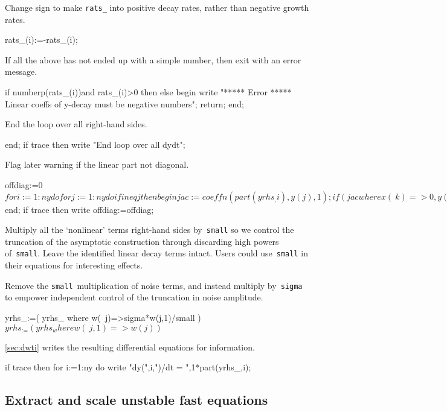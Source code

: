 \documentclass[11pt,a5paper]{article}
\begin{document}
Change sign to make \verb|rats_| into positive decay rates, rather than negative growth rates.
\begin{reduce}
  rats_(i):=-rats_(i); 
\end{reduce}

If all the above has not ended up with a simple number, then exit with an error message. 
\begin{reduce}
  if numberp(rats_(i))and rats_(i)>0 then
  else begin 
    write "***** Error *****
    Linear coeffs of y-decay must be negative numbers";
    return;
  end;
\end{reduce}

End the loop over all right-hand sides.
\begin{reduce}
end;
if trace then write "End loop over all dydt";
\end{reduce}

Flag later warning if the linear part not diagonal.
\begin{reduce}
offdiag:=0$
for i:=1:ny do for j:=1:ny do if i neq j then begin
  jac:=coeffn(part(yrhs_,i),y(j),1);
  if (jac where {x(~k)=>0,y(~k)=>0,z(~k)=>0,w(~k)=>0}) neq 0 
  then offdiag:=1$
end;
if trace then write offdiag:=offdiag;
\end{reduce}

Multiply all the `nonlinear' terms right-hand sides by~\verb|small| so we control the truncation of the asymptotic construction through discarding high powers of~\verb|small|.
Leave the identified linear decay terms intact.
Users could use~\verb|small| in their equations for interesting effects. 

Remove the \verb|small|~multiplication of noise terms, and instead multiply by~\verb|sigma| to empower independent control of the truncation in noise amplitude.
\begin{reduce}
yrhs_:=( yrhs_ where w(~j)=>sigma*w(j,1)/small )$
yrhs_:=( yrhs_ where w(~j,1)=>w(j) )$
\end{reduce}

\cref{sec:dwti} writes the resulting differential equations for information.
\begin{reduce}
if trace then for i:=1:ny do 
    write "dy(",i,")/dt = ",1*part(yrhs_,i);
\end{reduce}



\subsection{Extract and scale unstable fast equations}
\end{document}
